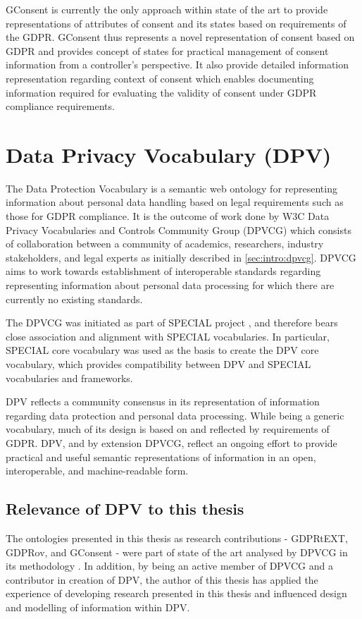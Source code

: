 GConsent is currently the only approach within state of the art to provide representations of attributes of consent and its states based on requirements of the GDPR.
GConsent thus represents a novel representation of consent based on GDPR and provides concept of states for practical management of consent information from a controller's perspective. It also provide detailed information representation regarding context of consent which enables documenting information required for evaluating the validity of consent under GDPR compliance requirements.

\section{Data Privacy Vocabulary (DPV)}\label{sec:voc:DPV}
The Data Protection Vocabulary \cite{pandit_creating_2019} is a semantic web ontology for representing information about personal data handling based on legal requirements such as those for GDPR compliance.
It is the outcome of work done by W3C Data Privacy Vocabularies and Controls Community Group (DPVCG) which consists of collaboration between a community of academics, researchers, industry stakeholders, and legal experts as initially described in \autoref{sec:intro:dpvcg}.
DPVCG aims to work towards establishment of interoperable standards regarding representing information about personal data processing for which there are currently no existing standards.

The DPVCG was initiated as part of SPECIAL project \cite{pandit_d6.5_2019}, and therefore bears close association and alignment with SPECIAL vocabularies.
In particular, SPECIAL core vocabulary was used as the basis to create the DPV core vocabulary, which provides compatibility between DPV and SPECIAL vocabularies and frameworks.

DPV reflects a community consensus in its representation of information regarding data protection and personal data processing. While being a generic vocabulary, much of its design is based on and reflected by requirements of GDPR. DPV, and by extension DPVCG, reflect an ongoing effort to provide practical and useful semantic representations of information in an open, interoperable, and machine-readable form. 

\subsection{Relevance of DPV to this thesis}
The ontologies presented in this thesis as research contributions - GDPRtEXT, GDPRov, and GConsent - were part of state of the art analysed by DPVCG in its methodology \cite{pandit_creating_2019}.
In addition, by being an active member of DPVCG and a contributor in creation of DPV, the author of this thesis has applied the experience of developing research presented in this thesis and influenced design and modelling of information within DPV.

